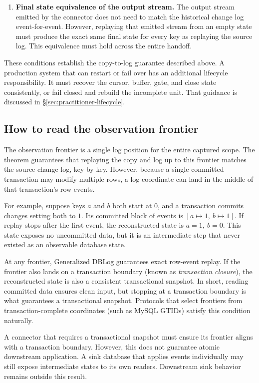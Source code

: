 \documentclass[sigconf,nonacm,10pt]{acmart}
\theoremstyle{plain}
\theoremstyle{definition}
\begin{document}
\begin{enumerate}
\item \textbf{Final state equivalence of the output stream.} The output  
stream emitted by the connector does not need to match the historical 
change log event-for-event. However, replaying that emitted stream from an 
empty state must produce the exact same final state for every key as 
replaying the source log. This equivalence must hold across the entire 
handoff.
\end{enumerate}

These conditions establish the copy-to-log guarantee described above.
A production system that can restart or fail over has an additional lifecycle
responsibility. It must recover the cursor, buffer, gate, and close state
consistently, or fail closed and rebuild the incomplete unit. That
guidance is discussed in \S\ref{sec:practitioner-lifecycle}.

\subsection{How to read the observation frontier}
\label{sec:practitioner-frontier}

The observation frontier is a single log position for the entire captured 
scope. The theorem guarantees that replaying the copy and log up to this 
frontier matches the source change log, key by key. However, because a 
single committed transaction may modify multiple rows, a log coordinate 
can land in the middle of that transaction's row events.

For example, suppose keys $a$ and $b$ both start at $0$, and a transaction 
commits changes setting both to $1$. Its committed block of events is 
$[a \mapsto 1,\ b \mapsto 1]$. If replay stops after the first event, the 
reconstructed state is $a=1,\ b=0$. This state exposes no uncommitted data, 
but it is an intermediate step that never existed as an observable database 
state.

At any frontier, Generalized DBLog guarantees exact row-event replay. If 
the frontier also lands on a transaction boundary (known as \emph{transaction 
closure}), the reconstructed state is also a consistent transactional 
snapshot. In short, reading committed data ensures clean input, but 
stopping at a transaction boundary is what guarantees a transactional snapshot. 
Protocols that select frontiers from transaction-complete coordinates 
(such as MySQL GTIDs) satisfy this condition naturally.

A connector that requires a transactional snapshot must ensure its 
frontier aligns with a transaction boundary. However, this does not guarantee 
atomic downstream application. A sink database that applies events individually 
may still expose intermediate states to its own readers. Downstream sink 
behavior remains outside this result.
\end{document}
